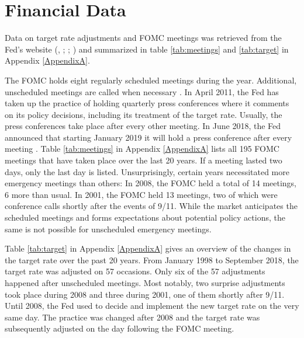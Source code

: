 \documentclass[11pt,a4paper,english,oneside]{book}
\numberwithin{equation}{chapter}
\begin{document}
\section{Financial Data}\label{Ch:financedata}

Data on target rate adjustments and FOMC meetings was retrieved from the Fed's website (\citealp{FRS.2018}, \citeyear{FRS.2013}; \citealp{FOMC.2018Archive}; \citeyear{FOMC.2018}) and summarized in table \ref{tab:meetings} and \ref{tab:target} in Appendix \ref{AppendixA}. 

The FOMC holds eight regularly scheduled meetings during the year. Additional, unscheduled meetings are called when necessary \citep{FOMC.2018}. In April 2011, the Fed has taken up the practice of holding quarterly press conferences where it comments on its policy decisions, including its treatment of the target rate. Usually, the press conferences take place after every other meeting. In June 2018, the Fed announced that starting January 2019 it will hold a press conference after every meeting \citep{PressConference.2018}. Table \ref{tab:meetings} in Appendix \ref{AppendixA} lists all 195 FOMC meetings that have taken place over the last 20 years. If a meeting lasted two days, only the last day is listed. Unsurprisingly, certain years necessitated more emergency meetings than others: In 2008, the FOMC held a total of 14 meetings, 6 more than usual. In 2001, the FOMC held 13 meetings, two of which were conference calls shortly after the events of 9/11. While the market anticipates the scheduled meetings and forms expectations about potential policy actions, the same is not possible for unscheduled emergency meetings. 

Table \ref{tab:target} in Appendix \ref{AppendixA} gives an overview of the changes in the target rate over the past 20 years. From January 1998 to September 2018, the target rate was adjusted on 57 occasions. Only six of the 57 adjustments happened after unscheduled meetings. Most notably, two surprise adjustments took place during 2008 and three during 2001, one of them shortly after 9/11. Until 2008, the Fed used to decide and implement the new target rate on the very same day. The practice was changed after 2008 and the target rate was subsequently adjusted on the day following the FOMC meeting. 
\end{document}
